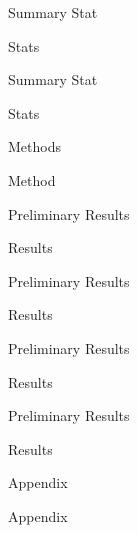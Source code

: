 \documentclass[aspectratio=169]{beamer}
\begin{document}
\begin{frame}{Summary Stat}

Stats

\end{frame}

\begin{frame}{Summary Stat}

Stats

\end{frame}

\begin{frame}{Methods}

Method

\end{frame}


\begin{frame}{Preliminary Results}

Results

\end{frame}

\begin{frame}{Preliminary Results}

Results

\end{frame}

\begin{frame}{Preliminary Results}

Results

\end{frame}

\begin{frame}{Preliminary Results}

Results

\end{frame}





\begin{frame}{Appendix \hyperlink{site2}{\beamerreturnbutton{}}
}
\label{site_2}

Appendix

\end{frame}
\end{document}

